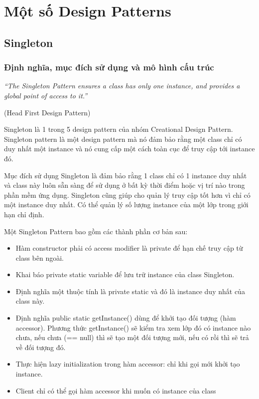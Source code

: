 \documentclass[14pt]{article}
\begin{document}
\section{ Một số Design Patterns}
\subsection{Singleton}
\subsubsection{ Định nghĩa, mục đích sử dụng và mô hình cấu trúc}
\textit{“The Singleton Pattern ensures a class has only one instance, and provides a global point of access to it.”}
\begin{flushright}
(Head First Design Pattern)
\end{flushright}

Singleton là 1 trong 5 design pattern của nhóm Creational Design Pattern. Singleton pattern là một design pattern mà nó đảm bảo rằng một class chỉ có duy nhất một instance và nó cung cấp một cách toàn cục để truy cập tới instance đó.

Mục đích sử dụng Singleton là đảm bảo rằng 1 class chỉ có 1 instance duy nhất và class này luôn sẵn sàng để sử dụng ở bất kỳ thời điểm hoặc vị trí nào trong phần mềm ứng dụng. Singleton cũng giúp cho quản lý truy cập tốt hơn vì chỉ có một instance duy nhất. Có thể quản lý số lượng instance của một lớp trong giới hạn chỉ định.

Một Singleton Pattern bao gồm các thành phần cơ bản sau:
\begin{itemize}
    \item Hàm constructor phải có access modifier là private để hạn chế truy cập từ class bên ngoài.
    \item Khai báo private static variable để lưu trữ instance của class Singleton.
    \item Định nghĩa một thuộc tính là private static và đó là instance duy nhất của class này.
    \item Định nghĩa public static getInstance() dùng để khởi tạo đối tượng (hàm accessor). Phương thức getInstance() sẽ kiểm tra xem lớp đó có instance nào chưa, nếu chưa (== null) thì sẽ tạo một đối tượng mới, nếu có rồi thì sẽ trả về đối tượng đó.
    \item Thực hiện lazy initialization trong hàm accessor: chỉ khi gọi mới khởi tạo instance.
    \item Client chỉ có thể gọi hàm accessor khi muốn có instance của class
\end{itemize}
\end{document}
